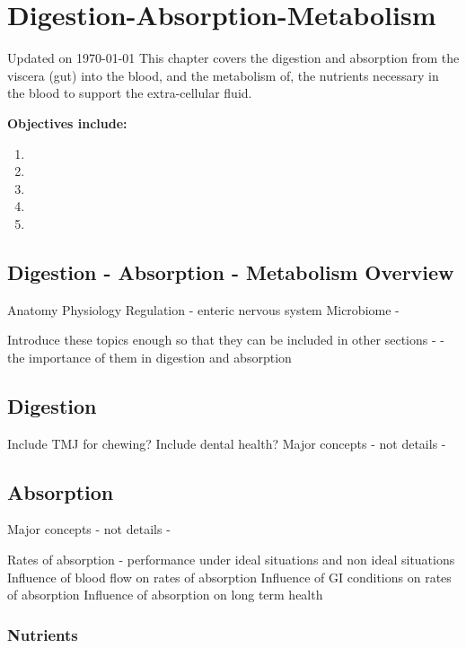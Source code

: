 \chapter{Digestion-Absorption-Metabolism}\label{chp:blood_nutrients}
Updated on \today
\minitoc
This chapter covers the digestion and absorption from the viscera (gut) into the blood, and the metabolism of, the nutrients necessary in the blood to support the extra-cellular fluid. 



\vspace{5mm}

\textbf{Objectives include:}
\begin{enumerate}
    \item
    \item
    \item
    \item
    \item
\end{enumerate}

\section{Digestion - Absorption - Metabolism Overview}
Anatomy
Physiology
Regulation - enteric nervous system
Microbiome - 

Introduce these topics enough so that they can be included in other sections - - the importance of them in digestion and absorption


\section{Digestion}

Include TMJ for chewing?
Include dental health?
Major concepts - not details - 

\section{Absorption}

Major concepts - not details - 

Rates of absorption - performance under ideal situations and non ideal situations
Influence of blood flow on rates of absorption
Influence of GI conditions on rates of absorption
Influence of absorption on long term health

\subsection{Nutrients}

